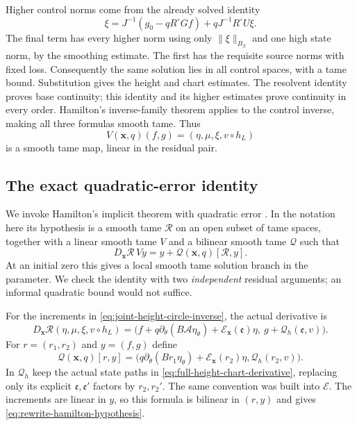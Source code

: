Higher control norms come from the already solved identity
\[
 \xi=J^{-1}(g_0-qR^\circ Gf)+qJ^{-1}R^\circ U\xi.
\]
The final term has every higher norm using only
$\|\xi\|_{B_\beta}$ and one high state norm, by the smoothing
estimate. The first has the requisite source norms with fixed loss.
Consequently the same solution lies in all control spaces, with a
tame bound. Substitution gives the height and chart estimates.
The resolvent identity proves base continuity; this identity and its
higher estimates prove continuity in every order. Hamilton's
inverse-family theorem applies to the control inverse, making all
three formulas smooth tame. Thus
\[
 V(\mathbf x,q)(f,g)=(\eta,\mu,\xi,v\circ h_L)
\]
is a smooth tame map, linear in the residual pair.

\subsection{The exact quadratic-error identity}

We invoke Hamilton's implicit theorem with quadratic error
\cite[III, Theorem~3.3.1, pp.~211--212]{Hamilton1982}.
In the notation here its hypothesis is a smooth tame $\mathcal R$
on an open subset of tame spaces, together with a linear smooth tame
$V$ and a bilinear smooth tame $\mathcal Q$ such that
\begin{equation}\label{eq:rewrite-hamilton-hypothesis}
 D_{\mathbf x}\mathcal R\,V y
                  =y+\mathcal Q(\mathbf x,q)[\mathcal R,y].
\end{equation}
At an initial zero this gives a local smooth tame solution branch in
the parameter. We check the identity with two \emph{independent}
residual arguments; an informal quadratic bound would not suffice.

For the increments in \eqref{eq:joint-height-circle-inverse}, the
actual derivative is
\begin{equation}\label{eq:joint-height-circle-quadratic-error}
 D_{\mathbf x}\mathcal R(\eta,\mu,\xi,v\circ h_L)
 =\bigl(f+q\partial_\theta(B\mathcal A\eta_\theta)
              +\mathscr E_{\mathbf x}(\mathfrak e)\eta,
        \ g+\mathcal Q_h(\mathfrak e,v)\bigr).
\end{equation}
For $r=(r_1,r_2)$ and $y=(f,g)$ define
\[
 \mathcal Q(\mathbf x,q)[r,y]
 =\bigl(q\partial_\theta(Br_1\eta_\theta)
                   +\mathscr E_{\mathbf x}(r_2)\eta,
              \mathcal Q_h(r_2,v)\bigr).
\]
In $\mathcal Q_h$ keep the actual state paths in
\eqref{eq:full-height-chart-derivative}, replacing only its explicit
$\mathfrak e,\mathfrak e'$ factors by $r_2,r_2'$.
The same convention was built into $\mathscr E$.
The increments are linear in $y$, so this formula is bilinear in
$(r,y)$ and gives \eqref{eq:rewrite-hamilton-hypothesis}.

